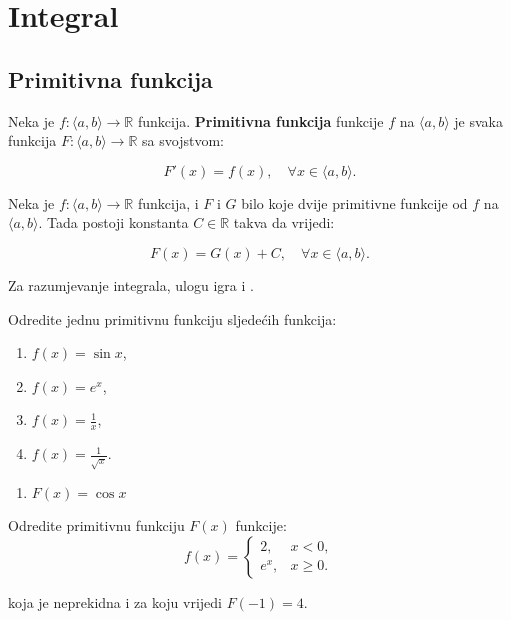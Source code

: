 \section{Integral}

\subsection{Primitivna funkcija}
Neka je $f: \langle a, b \rangle \to \mathbb{R}$ funkcija.
\textbf{Primitivna funkcija} funkcije $f$ na $\langle a, b \rangle$ je svaka
funkcija $F: \langle a, b \rangle \to \mathbb{R}$ sa svojstvom:

$$
F'(x) = f(x),\quad\forall x \in \langle a, b \rangle.
$$

\begin{theorem}
    Neka je $f: \langle a, b \rangle \to \mathbb{R}$ funkcija, i $F$ i $G$
    bilo koje dvije primitivne funkcije od $f$ na $\langle a, b \rangle$. Tada
    postoji konstanta $C\in\mathbb{R}$ takva da vrijedi:

    $$
    F(x) = G(x) + C,\quad\forall x \in \langle a, b \rangle.
    $$
\end{theorem}

Za razumjevanje integrala, ulogu igra i .

\begin{example}
    Odredite jednu primitivnu funkciju sljedećih funkcija:
    \begin{enumerate}
        \item $f(x) = \sin x$,
        \item $f(x) = e^x$,
        \item $f(x) = {\frac{1}{x}}$,
        \item $f(x) = {\frac{1}{\sqrt{x}}}$.
    \end{enumerate}
\end{example}

\begin{enumerate}
    \item $F(x) = \cos x$
\end{enumerate}

\begin{example}
    Odredite primitivnu funkciju $F(x)$ funkcije:
    $$
        f(x) = \begin{cases}
            2, & x < 0, \\
            e^x, & x \geq 0.
        \end{cases}
    $$

    koja je neprekidna i za koju vrijedi $F(-1) = 4$.
\end{example}

